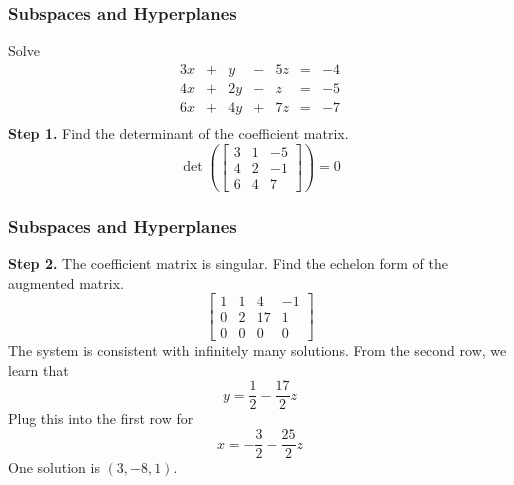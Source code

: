 \documentclass[xcolor=dvipsnames]{beamer}
\begin{document}
\begin{frame}
  \frametitle{Subspaces and Hyperplanes}
   Solve
  \begin{equation}
    \label{eq:leizaewu}
    \begin{array}{ccccccc}
      3x&+&y&-&5z&=&-4 \\
      4x&+&2y&-&z&=&-5 \\
      6x&+&4y&+&7z&=&-7 \\
    \end{array}
  \end{equation}
  \textbf{Step 1.} Find the determinant of the coefficient matrix.
  \begin{equation}
    \label{eq:faiquuko}
    \det\left(\left[
        \begin{array}{ccc}
          3&1&-5 \\
           4&2&-1 \\
           6&4&7
        \end{array}\right]\right)=0
  \end{equation}
\end{frame}

\begin{frame}
  \frametitle{Subspaces and Hyperplanes}
  \textbf{Step 2.} The coefficient matrix is singular. Find the
  echelon form of the augmented matrix.
  \begin{equation}
    \label{eq:ooroosuw}
    \left[
      \begin{array}{cccc}
      1&1&4&-1 \\
      0&2&17&1 \\
      0&0&0&0
    \end{array}\right]
  \end{equation}
The system is consistent with infinitely many solutions. From the
second row, we learn that
\begin{equation}
  \label{eq:ahpoquah}
  y=\frac{1}{2}-\frac{17}{2}z
\end{equation}
Plug this into the first row for
\begin{equation}
  \label{eq:zayochee}
  x=-\frac{3}{2}-\frac{25}{2}z
\end{equation}
One solution is $(3,-8,1)$. 
\end{frame}
\end{document}

